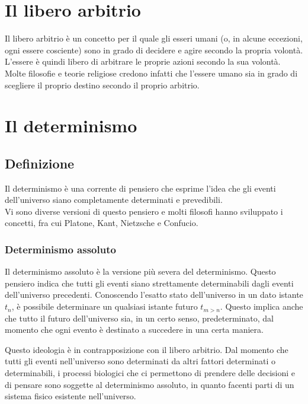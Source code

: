 \documentclass[a4paper, 12pt]{article}
\begin{document}
\section{Il libero arbitrio}

Il libero arbitrio è un concetto per il quale gli esseri umani
(o, in alcune eccezioni, ogni essere cosciente) sono in grado di decidere e agire secondo la propria volontà.
L'essere è quindi libero di arbitrare le proprie azioni secondo la sua volontà.
Molte filosofie e teorie religiose credono infatti che l'essere umano sia in grado
di scegliere il proprio destino secondo il proprio arbitrio.

\pagebreak

\section{Il determinismo}

\subsection{Definizione}

Il determinismo\cite{det} è una corrente di pensiero che esprime l'idea
che gli eventi dell'universo siano completamente determinati e prevedibili.
\\
Vi sono diverse versioni di questo pensiero e
molti filosofi hanno sviluppato i concetti, fra cui Platone, Kant,
Nietzsche e Confucio.

\subsubsection{Determinismo assoluto}

Il determinismo assoluto è la versione più severa del determinismo.
Questo pensiero indica che tutti gli eventi siano strettamente
determinabili dagli eventi dell'universo precedenti.
Conoscendo l'esatto stato dell'universo in un dato istante \(t_n\), è possibile
determinare un qualsiasi istante futuro \(t_{m > n}\).
Questo implica anche che tutto il futuro dell'universo sia,
in un certo senso, predeterminato, dal momento che ogni evento è destinato
a succedere in una certa maniera.

Questo ideologia è in contrapposizione con il libero arbitrio.
Dal momento che tutti gli eventi nell'universo sono determinati da altri fattori determinati
o determinabili, i processi biologici che ci permettono di prendere delle decisioni e di pensare
sono soggette al determinismo assoluto, in quanto facenti parti di un sistema fisico esistente nell'universo.
\end{document}
